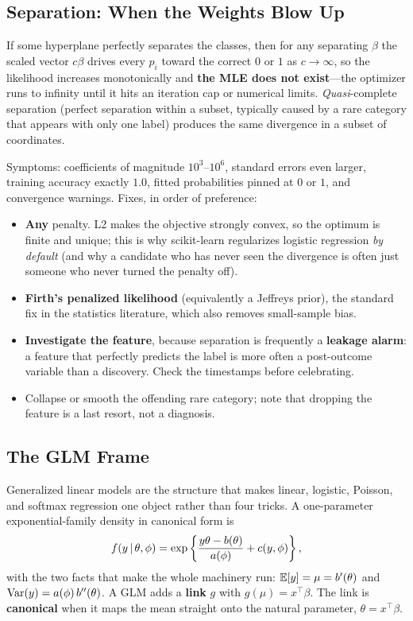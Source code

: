 \subsection{Separation: When the Weights Blow Up}

If some hyperplane perfectly separates the classes, then for any separating $\beta$ the scaled vector $c\beta$ drives every $p_i$ toward the correct $0$ or $1$ as $c \to \infty$, so the likelihood increases monotonically and \textbf{the MLE does not exist}---the optimizer runs to infinity until it hits an iteration cap or numerical limits. \emph{Quasi}-complete separation (perfect separation within a subset, typically caused by a rare category that appears with only one label) produces the same divergence in a subset of coordinates.

Symptoms: coefficients of magnitude $10^3$--$10^6$, standard errors even larger, training accuracy exactly $1.0$, fitted probabilities pinned at $0$ or $1$, and convergence warnings. Fixes, in order of preference:
\begin{itemize}
    \item \textbf{Any} penalty. L2 makes the objective strongly convex, so the optimum is finite and unique; this is why scikit-learn regularizes logistic regression \emph{by default} (and why a candidate who has never seen the divergence is often just someone who never turned the penalty off).
    \item \textbf{Firth's penalized likelihood} (equivalently a Jeffreys prior), the standard fix in the statistics literature, which also removes small-sample bias.
    \item \textbf{Investigate the feature}, because separation is frequently a \textbf{leakage alarm}: a feature that perfectly predicts the label is more often a post-outcome variable than a discovery. Check the timestamps before celebrating.
    \item Collapse or smooth the offending rare category; note that dropping the feature is a last resort, not a diagnosis.
\end{itemize}

\subsection{The GLM Frame}
\label{cml:sec:glm_family}

Generalized linear models are the structure that makes linear, logistic, Poisson, and softmax regression one object rather than four tricks. A one-parameter exponential-family density in canonical form is
\begin{equation}
f(y \,|\, \theta, \phi) = \exp\left\{\frac{y\theta - b(\theta)}{a(\phi)} + c(y,\phi)\right\},
\end{equation}
with the two facts that make the whole machinery run: $\operatorname{\mathbb{E}}[y] = \mu = b'(\theta)$ and $\operatorname{Var}(y) = a(\phi)\,b''(\theta)$. A GLM adds a \textbf{link} $g$ with $g(\mu) = x^{\top}\beta$. The link is \textbf{canonical} when it maps the mean straight onto the natural parameter, $\theta = x^{\top}\beta$.

